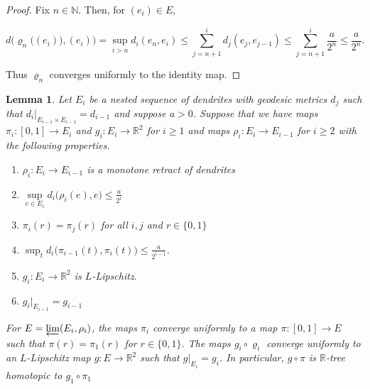 \documentclass[11pt, leqno]{amsart}
\newtheorem{lemma}[theorem]{Lemma}
\theoremstyle{definition}\newtheorem{definition}[theorem]{Definition}
\begin{document}
\begin{proof}
     Fix $n\in\mathbb{N}$.  Then, for $(e_i)\in E$,

     \[
        d\big(\varrho_n\big((e_i)\big),(e_i)\big) =  \sup_{i>n} d_i(e_n, e_i) \leq \sum_{j=n+1}^{i}d_j(e_j,e_{j-1}) \leq  \sum_{j=n+1}^{i}\frac{a}{2^n}\leq \frac{a}{2^n}.
    \]

Thus $\varrho_n$ converges uniformly to the identity map.
\end{proof}

\begin{lemma}\label{lem: limit is r-tree homotopic}
Let $E_i$ be a nested sequence of dendrites with geodesic metrics $d_j$ such that $d_{i}|_{E_{i-1}\times E_{i-1}} = d_{i-1}$ and suppose $a>0$. Suppose that we have maps $\pi_i:[0,1]\to E_i$ and $g_i: E_i\to \mathbb R^2$ for $i\geq 1$ and maps $\rho_i:E_i\to E_{i-1}$ for $i\geq 2$ with the following properties.

    \begin{enumerate}
        \item $\rho_i:E_i\to E_{i-1}$ is a monotone retract of dendrites
        \item $\sup\limits_{e\in E_i}d_i\big(\rho_i(e), e\big)\leq \frac{a}{2^i}$
        \item\label{fixed ends}$\pi_i(r) = \pi_j(r)$ for all $i,j$ and $r\in \{0,1\}$
        \item\label{cauchy} $\sup_t d_i\big(\pi_{i-1}(t), \pi_i(t)\big)\leq \frac{a}{2^{i-1}}$.
        \item $g_i: E_i\to \mathbb R^2$ is $L$-Lipschitz.
        \item $g_i|_{E_{i-1}} = g_{i-1}$
    \end{enumerate}

    For $E = \varprojlim(E_i, \rho_i)$,  the maps $\pi_i$ converge uniformly to a map $\pi: [0,1]\to E$ such that $\pi(r) = \pi_1(r)$ for $r\in \{0,1\}$.  The maps $g_i\circ\varrho_i$ converge uniformly to an $L$-Lipschitz map $g: E \to \mathbb R^2$ such that $g|_{E_i} = g_i$.  In particular, $g\circ\pi$ is $\mathbb R$-tree homotopic to $g_1\circ \pi_1$
\end{lemma}
\end{document}
